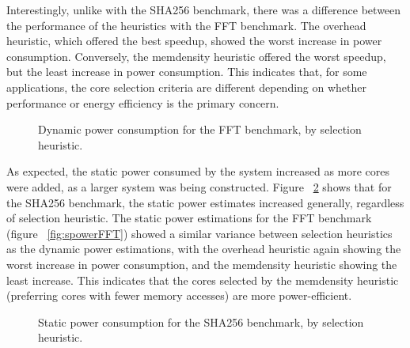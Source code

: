 \documentclass{UoYCSproject}
\begin{document}
Interestingly, unlike with the SHA256 benchmark, there was a difference between the performance of the heuristics with the
FFT benchmark. The overhead heuristic, which offered the best speedup,
showed the worst increase in power consumption. Conversely, the memdensity heuristic offered the worst speedup,
but the least increase in power consumption. This indicates that, for some applications, the core selection
criteria are different depending on whether performance or energy efficiency is the primary concern.

\begin{figure}[H]
\caption{Dynamic power consumption for the FFT benchmark, by selection heuristic.}
\label{fig:dpowerFFT}
\end{figure}

As expected, the static power consumed by the system increased as more cores were added, as a larger system was being
constructed. Figure ~\ref{fig:spowerSHA256} shows that for the SHA256 benchmark, the static power estimates
increased generally, regardless of selection heuristic. The static power estimations for the FFT benchmark
(figure ~\ref{fig:spowerFFT}) showed a similar variance between selection heuristics as the dynamic power estimations,
with the overhead heuristic again showing the worst increase in power consumption, and the memdensity heuristic showing the
least increase. This indicates that the cores selected by the memdensity heuristic (preferring cores with fewer memory accesses)
are more power-efficient.

\begin{figure}[H]
\caption{Static power consumption for the SHA256 benchmark, by selection heuristic.}
\label{fig:spowerSHA256}
\end{figure}
\end{document}
